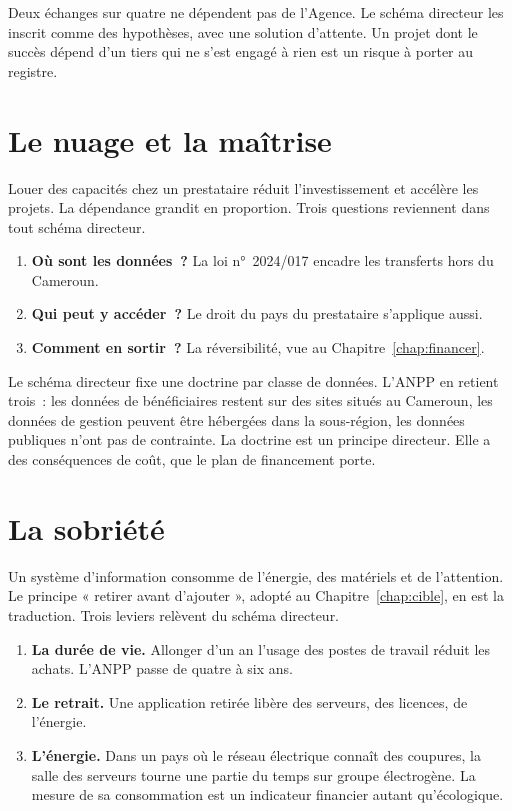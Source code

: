 Deux échanges sur quatre ne dépendent pas de l'Agence. Le schéma directeur les inscrit comme des hypothèses,
avec une solution d'attente. Un projet dont le succès dépend d'un tiers qui ne s'est engagé à rien est un
risque à porter au registre.

\section{Le nuage et la maîtrise}
\label{sec:c15-nuage}

Louer des capacités chez un prestataire réduit l'investissement et accélère les projets. La dépendance grandit
en proportion. Trois questions reviennent dans tout schéma directeur.

\begin{enumerate}
    \item \textbf{Où sont les données~?} La loi n°~2024/017 encadre les transferts hors du Cameroun.
    \item \textbf{Qui peut y accéder~?} Le droit du pays du prestataire s'applique aussi.
    \item \textbf{Comment en sortir~?} La réversibilité, vue au Chapitre~\ref{chap:financer}.
\end{enumerate}

Le schéma directeur fixe une doctrine par classe de données. L'ANPP en retient trois~: les données de
bénéficiaires restent sur des sites situés au Cameroun, les données de gestion peuvent être hébergées dans la
sous-région, les données publiques n'ont pas de contrainte. La doctrine est un principe directeur. Elle a des
conséquences de coût, que le plan de financement porte.

\section{La sobriété}
\label{sec:c15-sobriete}

Un système d'information consomme de l'énergie, des matériels et de l'attention. Le principe « retirer avant
d'ajouter », adopté au Chapitre~\ref{chap:cible}, en est la traduction. Trois leviers relèvent du schéma
directeur.

\begin{enumerate}
    \item \textbf{La durée de vie.} Allonger d'un an l'usage des postes de travail réduit les achats. L'ANPP
          passe de quatre à six ans.
    \item \textbf{Le retrait.} Une application retirée libère des serveurs, des licences, de l'énergie.
    \item \textbf{L'énergie.} Dans un pays où le réseau électrique connaît des coupures, la salle des serveurs
          tourne une partie du temps sur groupe électrogène. La mesure de sa consommation est un indicateur
          financier autant qu'écologique.
\end{enumerate}

